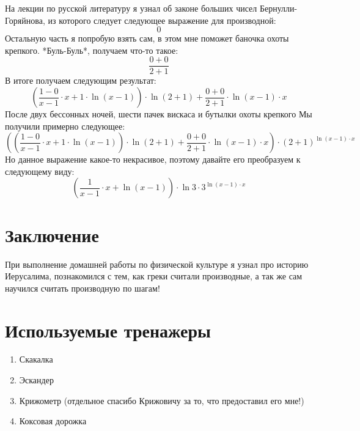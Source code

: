 \documentclass[a4paper,12pt]{article}
\begin{document}
На лекции по русской литературу я узнал об законе больших чисел Бернулли-Горяйнова, из которого следует следующее выражение для производной:
\begin{equation}
0
\end{equation} 
Остальную часть я попробую взять сам, в этом мне поможет баночка охоты крепкого. *Буль-Буль*, получаем что-то такое:
\begin{equation}
\frac{0+0}{2+1} 
\end{equation} 
В итоге получаем следующим результат:
\begin{equation}
\left(\frac{1-0}{x-1}  \cdot x+1 \cdot \ln(x-1) \right) \cdot \ln(2+1) +\frac{0+0}{2+1}  \cdot \ln(x-1)  \cdot x
\end{equation} 
После двух бессонных ночей, шести пачек вискаса и бутылки охоты крепкого Мы получили примерно следующее:
\begin{equation}
\left(\left(\frac{1-0}{x-1}  \cdot x+1 \cdot \ln(x-1) \right) \cdot \ln(2+1) +\frac{0+0}{2+1}  \cdot \ln(x-1)  \cdot x\right) \cdot \left(2+1\right)^{\ln(x-1)  \cdot x} 
\end{equation} 
Но данное выражение какое-то некрасивое, поэтому давайте его преобразуем к следующему виду:
\begin{equation}
\left(\frac{1}{x-1}  \cdot x+\ln(x-1) \right) \cdot \ln3 \cdot 3^{\ln(x-1)  \cdot x} 
\end{equation} 
\section{Заключение}
 При выполнение домашней работы по физической культуре я узнал про историю Иерусалима, познакомился с тем, как греки считали производные, а так же сам научился считать производную по шагам!
\section{Используемые тренажеры}
 \begin{enumerate}
 \item Скакалка
 \item Эскандер
 \item Крижометр (отдельное спасибо Крижовичу за то, что предоставил его мне!)
 \item Коксовая дорожка
 \end{enumerate}
\end{document}
